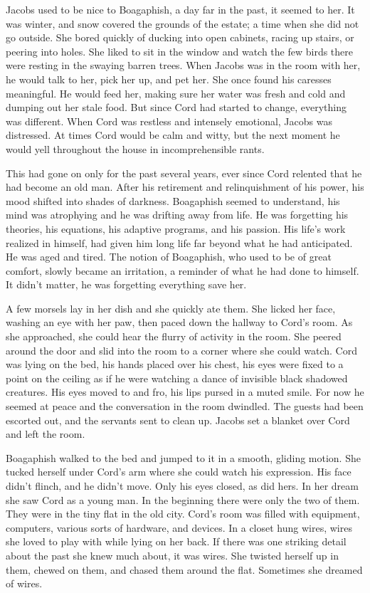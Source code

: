Jacobs used to be nice to Boagaphish, a day far in the past, it seemed
to her. It was winter, and snow covered the grounds of the estate; a
time when she did not go outside. She bored quickly of ducking into open
cabinets, racing up stairs, or peering into holes. She liked to sit in
the window and watch the few birds there were resting in the swaying
barren trees. When Jacobs was in the room with her, he would talk to
her, pick her up, and pet her. She once found his caresses meaningful.
He would feed her, making sure her water was fresh and cold and dumping
out her stale food. But since Cord had started to change, everything was
different. When Cord was restless and intensely emotional, Jacobs was
distressed. At times Cord would be calm and witty, but the next moment
he would yell throughout the house in incomprehensible rants.

This had gone on only for the past several years, ever since Cord
relented that he had become an old man. After his retirement and
relinquishment of his power, his mood shifted into shades of darkness.
Boagaphish seemed to understand, his mind was atrophying and he was
drifting away from life. He was forgetting his theories, his equations,
his adaptive programs, and his passion. His life's work realized in
himself, had given him long life far beyond what he had anticipated. He
was aged and tired. The notion of Boagaphish, who used to be of great
comfort, slowly became an irritation, a reminder of what he had done to
himself. It didn't matter, he was forgetting everything save her.

A few morsels lay in her dish and she quickly ate them. She licked her
face, washing an eye with her paw, then paced down the hallway to Cord's
room. As she approached, she could hear the flurry of activity in the
room. She peered around the door and slid into the room to a corner
where she could watch. Cord was lying on the bed, his hands placed over
his chest, his eyes were fixed to a point on the ceiling as if he were
watching a dance of invisible black shadowed creatures. His eyes moved
to and fro, his lips pursed in a muted smile. For now he seemed at peace
and the conversation in the room dwindled. The guests had been escorted
out, and the servants sent to clean up. Jacobs set a blanket over Cord
and left the room.

Boagaphish walked to the bed and jumped to it in a smooth, gliding
motion. She tucked herself under Cord's arm where she could watch his
expression. His face didn't flinch, and he didn't move. Only his eyes
closed, as did hers. In her dream she saw Cord as a young man. In the
beginning there were only the two of them. They were in the tiny flat in
the old city. Cord's room was filled with equipment, computers, various
sorts of hardware, and devices. In a closet hung wires, wires she loved
to play with while lying on her back. If there was one striking detail
about the past she knew much about, it was wires. She twisted herself up
in them, chewed on them, and chased them around the flat. Sometimes she
dreamed of wires.

